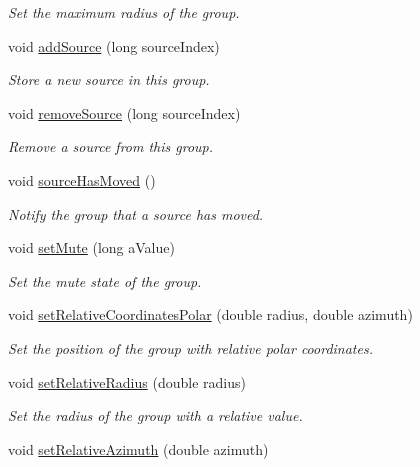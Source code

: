 \begin{DoxyCompactItemize}
\begin{DoxyCompactList}\small\item\em Set the maximum radius of the group. \end{DoxyCompactList}\item 
void \hyperlink{class_hoa2_d_1_1_sources_group_ad05f1ba55e8650602f44884ec231e3f2}{add\-Source} (long source\-Index)
\begin{DoxyCompactList}\small\item\em Store a new source in this group. \end{DoxyCompactList}\item 
void \hyperlink{class_hoa2_d_1_1_sources_group_acd8fea49b7e8100e32e0c3084809c4fd}{remove\-Source} (long source\-Index)
\begin{DoxyCompactList}\small\item\em Remove a source from this group. \end{DoxyCompactList}\item 
void \hyperlink{class_hoa2_d_1_1_sources_group_a4391c31487e8a072a27b6cb8b2a23388}{source\-Has\-Moved} ()
\begin{DoxyCompactList}\small\item\em Notify the group that a source has moved. \end{DoxyCompactList}\item 
void \hyperlink{class_hoa2_d_1_1_sources_group_a4e8924d6ed9044049889f0108a5e747d}{set\-Mute} (long a\-Value)
\begin{DoxyCompactList}\small\item\em Set the mute state of the group. \end{DoxyCompactList}\item 
void \hyperlink{class_hoa2_d_1_1_sources_group_a8d05a2e55535d7520729e8a22eca4c5f}{set\-Relative\-Coordinates\-Polar} (double radius, double azimuth)
\begin{DoxyCompactList}\small\item\em Set the position of the group with relative polar coordinates. \end{DoxyCompactList}\item 
void \hyperlink{class_hoa2_d_1_1_sources_group_a8d7b61654d7595ab1e37ab008c555436}{set\-Relative\-Radius} (double radius)
\begin{DoxyCompactList}\small\item\em Set the radius of the group with a relative value. \end{DoxyCompactList}\item 
void \hyperlink{class_hoa2_d_1_1_sources_group_a0236220c35e9d7c9cf6a87668955530c}{set\-Relative\-Azimuth} (double azimuth)

\end{DoxyCompactItemize}
